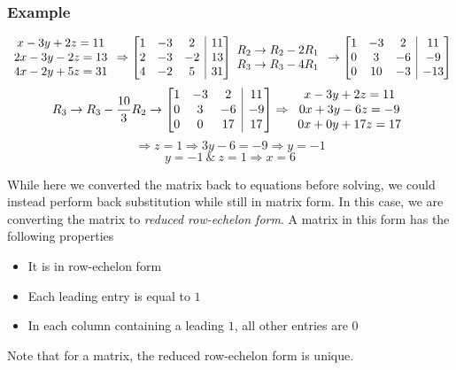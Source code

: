 \documentclass[12pt]{report}
\makeatletter
\newenvironment{amatrix}[1]{
    \left[\begin{array}{@{}*{#1}{c}|c@{}}
}{
    \end{array}\right]
}
\makeatother
\begin{document}
\begin{flushleft}
\subsubsection*{Example}


\[
    \begin{array}{c}
        x - 3y + 2z = 11 \\
        2x - 3y - 2z = 13 \\
        4x - 2y + 5z = 31 \\ 
    \end{array}
    \Rightarrow
    \begin{amatrix}{3}
        1 & -3 & 2 & 11 \\
        2 & -3 & -2 & 13 \\
        4 & -2 & 5 & 31 \\
    \end{amatrix}
    \begin{array}{c}
        R_2 \rightarrow R_2 - 2R_1 \\
        R_3 \rightarrow R_3 - 4R_1
    \end{array}
    \rightarrow
    \begin{amatrix}{3}
        1 & -3 & 2 & 11 \\
        0 & 3 & -6 & -9 \\
        0 & 10 & -3 & -13 \\
    \end{amatrix}
\]
\[
    R_3 \rightarrow R_3 - \frac{10}{3}R_2
    \rightarrow
    \begin{amatrix}{3}
        1 & -3 & 2 & 11 \\
        0 & 3 & -6 & -9 \\
        0 & 0 & 17 & 17 \\
    \end{amatrix}
    \Rightarrow
    \begin{array}{c}
        x -3y + 2z = 11 \\
        0x + 3y -6z = -9 \\
        0x + 0y + 17z = 17            
    \end{array}
\]
\[\Rightarrow z = 1 \Rightarrow 3y - 6 = -9 \Rightarrow y = -1\]
\[y = -1 \:\&\: z = 1 \Rightarrow x = 6\]

While here we converted the matrix back to equations before solving, we could
instead perform back substitution while still in matrix form. In this case, we
are converting the matrix to \textit{reduced row-echelon form}. A matrix in this
form has the following properties
\begin{itemize}
    \item It is in row-echelon form
    \item Each leading entry is equal to \(1\)
    \item In each column containing a leading \(1\), all other entries are \(0\)
\end{itemize}
Note that for a matrix, the reduced row-echelon form is unique.


\end{flushleft}
\end{document}
